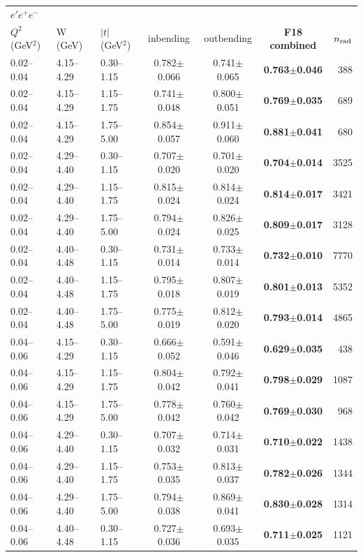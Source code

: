 \begin{tabular}{lllcccr}\toprule
\multicolumn{7}{l}{$e'e^+e^-$}\\
$Q^2$ (GeV$^2$) & W (GeV) & $|t|$ (GeV$^2$) & inbending & outbending & \textbf{F18 combined} & $n_{\rm rad}$ \\\midrule
0.02--0.04 & 4.15--4.29 & 0.30--1.15 & 0.782$\pm$0.066 & 0.741$\pm$0.065 & \textbf{0.763$\pm$0.046} & 388 \\
0.02--0.04 & 4.15--4.29 & 1.15--1.75 & 0.741$\pm$0.048 & 0.800$\pm$0.051 & \textbf{0.769$\pm$0.035} & 689 \\
0.02--0.04 & 4.15--4.29 & 1.75--5.00 & 0.854$\pm$0.057 & 0.911$\pm$0.060 & \textbf{0.881$\pm$0.041} & 680 \\
0.02--0.04 & 4.29--4.40 & 0.30--1.15 & 0.707$\pm$0.020 & 0.701$\pm$0.020 & \textbf{0.704$\pm$0.014} & 3525 \\
0.02--0.04 & 4.29--4.40 & 1.15--1.75 & 0.815$\pm$0.024 & 0.814$\pm$0.024 & \textbf{0.814$\pm$0.017} & 3421 \\
0.02--0.04 & 4.29--4.40 & 1.75--5.00 & 0.794$\pm$0.024 & 0.826$\pm$0.025 & \textbf{0.809$\pm$0.017} & 3128 \\
0.02--0.04 & 4.40--4.48 & 0.30--1.15 & 0.731$\pm$0.014 & 0.733$\pm$0.014 & \textbf{0.732$\pm$0.010} & 7770 \\
0.02--0.04 & 4.40--4.48 & 1.15--1.75 & 0.795$\pm$0.018 & 0.807$\pm$0.019 & \textbf{0.801$\pm$0.013} & 5352 \\
0.02--0.04 & 4.40--4.48 & 1.75--5.00 & 0.775$\pm$0.019 & 0.812$\pm$0.020 & \textbf{0.793$\pm$0.014} & 4865 \\
0.04--0.06 & 4.15--4.29 & 0.30--1.15 & 0.666$\pm$0.052 & 0.591$\pm$0.046 & \textbf{0.629$\pm$0.035} & 438 \\
0.04--0.06 & 4.15--4.29 & 1.15--1.75 & 0.804$\pm$0.042 & 0.792$\pm$0.041 & \textbf{0.798$\pm$0.029} & 1087 \\
0.04--0.06 & 4.15--4.29 & 1.75--5.00 & 0.778$\pm$0.042 & 0.760$\pm$0.042 & \textbf{0.769$\pm$0.030} & 968 \\
0.04--0.06 & 4.29--4.40 & 0.30--1.15 & 0.707$\pm$0.032 & 0.714$\pm$0.031 & \textbf{0.710$\pm$0.022} & 1438 \\
0.04--0.06 & 4.29--4.40 & 1.15--1.75 & 0.753$\pm$0.035 & 0.813$\pm$0.037 & \textbf{0.782$\pm$0.026} & 1344 \\
0.04--0.06 & 4.29--4.40 & 1.75--5.00 & 0.794$\pm$0.038 & 0.869$\pm$0.041 & \textbf{0.830$\pm$0.028} & 1314 \\
0.04--0.06 & 4.40--4.48 & 0.30--1.15 & 0.727$\pm$0.036 & 0.693$\pm$0.035 & \textbf{0.711$\pm$0.025} & 1121 \\

\end{tabular}
